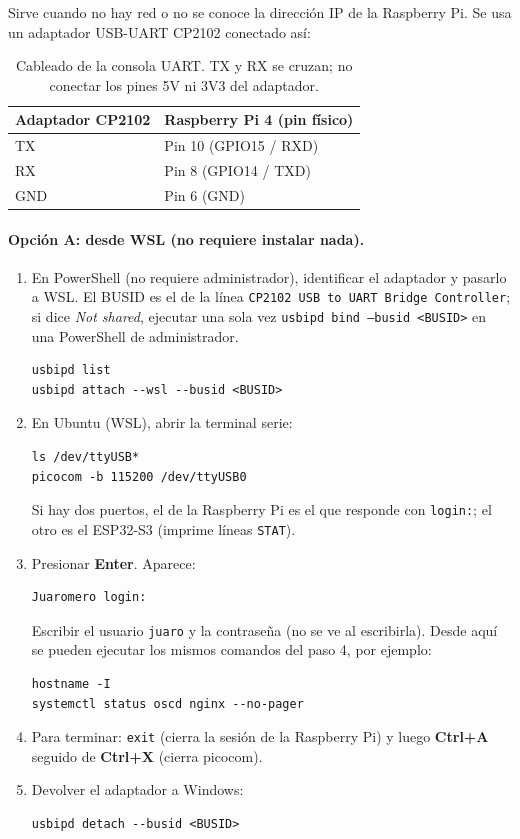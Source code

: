 \documentclass[12pt,a4paper]{article}
\begin{document}
Sirve cuando no hay red o no se conoce la dirección IP de la Raspberry Pi. Se usa un adaptador USB-UART CP2102 conectado así:

\begin{table}[H]
\centering
\small
\begin{tabular}{@{}p{3.6cm} p{6.0cm}@{}}
\toprule
\textbf{Adaptador CP2102} & \textbf{Raspberry Pi 4 (pin físico)} \\
\midrule
TX  & Pin 10 (GPIO15 / RXD) \\
RX  & Pin 8 (GPIO14 / TXD) \\
GND & Pin 6 (GND) \\
\bottomrule
\end{tabular}
\caption{Cableado de la consola UART. TX y RX se cruzan; no conectar los pines 5V ni 3V3 del adaptador.}
\end{table}

\paragraph{Opción A: desde WSL (no requiere instalar nada).}

\begin{enumerate}
  \item En PowerShell (no requiere administrador), identificar el adaptador y pasarlo a WSL. El BUSID es el de la línea \texttt{CP2102 USB to UART Bridge Controller}; si dice \emph{Not shared}, ejecutar una sola vez \texttt{usbipd bind --busid <BUSID>} en una PowerShell de administrador.
\begin{verbatim}
usbipd list
usbipd attach --wsl --busid <BUSID>
\end{verbatim}
  \item En Ubuntu (WSL), abrir la terminal serie:
\begin{verbatim}
ls /dev/ttyUSB*
picocom -b 115200 /dev/ttyUSB0
\end{verbatim}
  Si hay dos puertos, el de la Raspberry Pi es el que responde con \texttt{login:}; el otro es el ESP32-S3 (imprime líneas \texttt{STAT}).
  \item Presionar \textbf{Enter}. Aparece:
\begin{verbatim}
Juaromero login:
\end{verbatim}
  Escribir el usuario \texttt{juaro} y la contraseña (no se ve al escribirla). Desde aquí se pueden ejecutar los mismos comandos del paso 4, por ejemplo:
\begin{verbatim}
hostname -I
systemctl status oscd nginx --no-pager
\end{verbatim}
  \item Para terminar: \texttt{exit} (cierra la sesión de la Raspberry Pi) y luego \textbf{Ctrl+A} seguido de \textbf{Ctrl+X} (cierra picocom).
  \item Devolver el adaptador a Windows:
\begin{verbatim}
usbipd detach --busid <BUSID>
\end{verbatim}
\end{enumerate}
\end{document}
